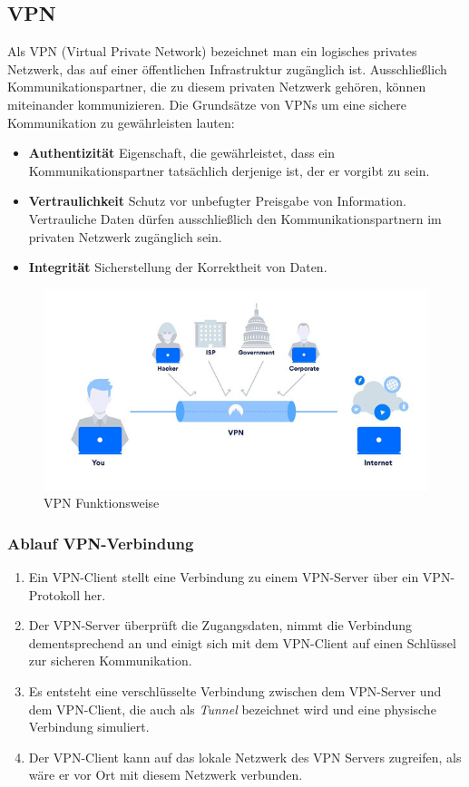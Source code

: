 \subsection{VPN}
Als VPN (Virtual Private Network) bezeichnet man ein logisches privates Netzwerk, das auf einer öffentlichen Infrastruktur zugänglich ist. Ausschließlich Kommunikationspartner, die zu diesem privaten Netzwerk gehören, können miteinander kommunizieren.\newline
Die Grundsätze von VPNs um eine sichere Kommunikation zu gewährleisten lauten:
\begin{itemize}
    \item \textbf{Authentizität} \newline
    Eigenschaft, die gewährleistet, dass ein Kommunikationspartner tatsächlich derjenige ist, der er vorgibt zu sein.
    \item \textbf{Vertraulichkeit} \newline
    Schutz vor unbefugter Preisgabe von Information. Vertrauliche Daten dürfen ausschließlich den Kommunikationspartnern im privaten Netzwerk zugänglich sein.
    \item \textbf{Integrität} \newline
    Sicherstellung der Korrektheit von Daten.
\end{itemize}
\begin{figure}[H]
  \centering
  \includegraphics[scale=0.85]{images/vpn.jpg}
  \caption{VPN Funktionsweise}
\end{figure}
\subsubsection{Ablauf VPN-Verbindung}
\begin{enumerate}
    \item Ein VPN-Client stellt eine Verbindung zu einem VPN-Server über ein VPN-Protokoll her.
    \item Der VPN-Server überprüft die Zugangsdaten, nimmt die Verbindung dementsprechend an und einigt sich mit dem VPN-Client auf einen Schlüssel zur sicheren Kommunikation.
    \item Es entsteht eine verschlüsselte Verbindung zwischen dem VPN-Server und dem VPN-Client, die auch als \textit{Tunnel} bezeichnet wird und eine physische Verbindung simuliert.
    \item Der VPN-Client kann auf das lokale Netzwerk des VPN Servers zugreifen, als wäre er vor Ort mit diesem Netzwerk verbunden.
\end{enumerate}


